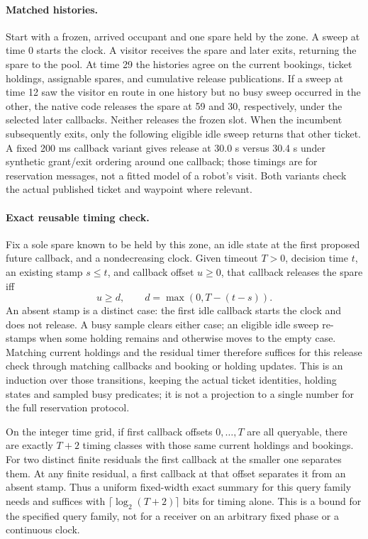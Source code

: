 \documentclass{article}
\begin{document}
\paragraph{Matched histories.}
Start with a frozen, arrived occupant and one spare held by the zone. A sweep at time 0 starts the clock. A visitor receives the spare and later exits, returning the spare to the pool. At time 29 the histories agree on the current bookings, ticket holdings, assignable spares, and cumulative release publications. If a sweep at time 12 saw the visitor en route in one history but no busy sweep occurred in the other, the native code releases the spare at 59 and 30, respectively, under the selected later callbacks. Neither releases the frozen slot. When the incumbent subsequently exits, only the following eligible idle sweep returns that other ticket. A fixed 200 ms callback variant gives release at 30.0 s versus 30.4 s under synthetic grant/exit ordering around one callback; those timings are for reservation messages, not a fitted model of a robot's visit. Both variants check the actual published ticket and waypoint where relevant.

\paragraph{Exact reusable timing check.}
Fix a sole spare known to be held by this zone, an idle state at the first proposed future callback, and a nondecreasing clock. Given timeout \(T>0\), decision time \(t\), an existing stamp \(s\le t\), and callback offset \(u\ge 0\), that callback releases the spare iff
\[
 u\ge d,\qquad d=\max(0,T-(t-s)).
\]
An absent stamp is a distinct case: the first idle callback starts the clock and does not release. A busy sample clears either case; an eligible idle sweep re-stamps when some holding remains and otherwise moves to the empty case. Matching current holdings and the residual timer therefore suffices for this release check through matching callbacks and booking or holding updates. This is an induction over those transitions, keeping the actual ticket identities, holding states and sampled busy predicates; it is not a projection to a single number for the full reservation protocol.

On the integer time grid, if first callback offsets \(0,\dots,T\) are all queryable, there are exactly \(T+2\) timing classes with those same current holdings and bookings. For two distinct finite residuals the first callback at the smaller one separates them. At any finite residual, a first callback at that offset separates it from an absent stamp. Thus a uniform fixed-width exact summary for this query family needs and suffices with \(\lceil\log_2(T+2)\rceil\) bits for timing alone. This is a bound for the specified query family, not for a receiver on an arbitrary fixed phase or a continuous clock.
\end{document}
